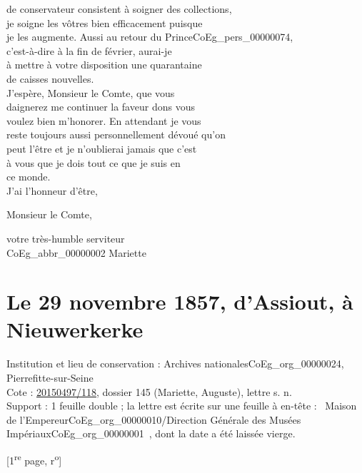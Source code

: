 \documentclass{book}
\begin{document}
de conservateur consistent à soigner des collections,\\
je soigne les vôtres bien efficacement puisque\\
je les augmente. Aussi au retour du Prince\gls{CoEg_pers_00000074},\\
c’est-à-dire à la fin de février, aurai-je\\
à mettre à votre disposition une quarantaine\\
de caisses nouvelles.\\
\indent J’espère, Monsieur le Comte, que vous\\
daignerez me continuer la faveur dons vous\\
voulez bien m’honorer. En attendant je vous\\
reste toujours aussi personnellement dévoué qu’on\\
peut l’être et je n’oublierai jamais que c’est\\
à vous que je dois tout ce que je suis en\\
ce monde.\\
\indent J’ai l’honneur d’être,
\begin{center}Monsieur le Comte,\end{center}
\begin{center}\hspace{5cm}votre très-humble serviteur\\
\hspace{5cm} \gls{CoEg_abbr_00000002} Mariette\end{center}
\section*{Le 29 novembre 1857, d'Assiout, à Nieuwerkerke} \label{CoEg_Mariette_1857-11-29}
{\footnotesize
\noindent Institution et lieu de conservation : Archives nationales\gls{CoEg_org_00000024}, Pierrefitte-sur-Seine\\
Cote : \hyperref[CoEg_Mariette_ms_001]{20150497/118}, dossier 145 (Mariette, Auguste), lettre s. n.\\
Support : 1 feuille double ; la lettre est écrite sur une feuille à en-tête : \og ~Maison de l'Empereur\gls{CoEg_org_00000010}/Direction Générale des Musées Impériaux\gls{CoEg_org_00000001}~\fg, dont la date a été laissée vierge.

\begin{center} {[1\textsuperscript{re} page, r\textsuperscript{o}]}\end{center}}
\end{document}
